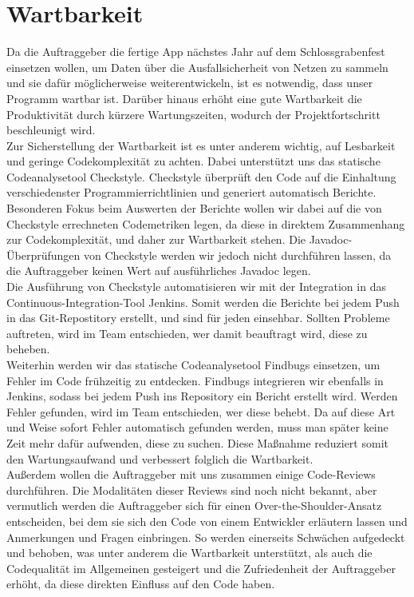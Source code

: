 \documentclass[accentcolor=tud0b,12pt,paper=a4]{tudreport}
\begin{document}
    \section{Wartbarkeit}

    Da die Auftraggeber die fertige App nächstes Jahr auf dem Schlossgrabenfest einsetzen wollen, um Daten über die Ausfallsicherheit von Netzen zu sammeln und sie dafür möglicherweise weiterentwickeln, ist es notwendig, dass unser Programm wartbar ist. Darüber hinaus erhöht eine gute Wartbarkeit die Produktivität durch kürzere Wartungszeiten, wodurch der Projektfortschritt beschleunigt wird.\\

                Zur Sicherstellung der Wartbarkeit ist es unter anderem wichtig, auf Lesbarkeit und geringe Codekomplexität zu achten. Dabei unterstützt uns das statische Codeanalysetool Checkstyle. Checkstyle überprüft den Code auf die Einhaltung verschiedenster Programmierrichtlinien und generiert automatisch Berichte. Besonderen Fokus beim Auswerten der Berichte wollen wir dabei auf die von Checkstyle errechneten Codemetriken legen, da diese in direktem Zusammenhang zur Codekomplexität, und daher zur Wartbarkeit stehen. Die Javadoc-Überprüfungen von Checkstyle werden wir jedoch nicht durchführen lassen, da die Auftraggeber keinen Wert auf ausführliches Javadoc legen.\\

                Die Ausführung von Checkstyle automatisieren wir mit der Integration in das Continuous-Integration-Tool Jenkins. Somit werden die Berichte bei jedem Push in das Git-Repostitory erstellt, und sind für jeden einsehbar. Sollten Probleme auftreten, wird im Team entschieden, wer damit beauftragt wird, diese zu beheben.\\

                Weiterhin werden wir das statische Codeanalysetool Findbugs einsetzen, um Fehler im Code frühzeitig zu entdecken. Findbugs integrieren wir ebenfalls in Jenkins, sodass bei jedem Push ins Repository ein Bericht erstellt wird. Werden Fehler gefunden, wird im Team entschieden, wer diese behebt. Da auf diese Art und Weise sofort Fehler automatisch gefunden werden, muss man später keine Zeit mehr dafür aufwenden, diese zu suchen. Diese Maßnahme reduziert somit den Wartungsaufwand und verbessert folglich die Wartbarkeit.\\

                Außerdem wollen die Auftraggeber mit uns zusammen einige Code-Reviews durchführen. Die Modalitäten dieser Reviews sind noch nicht bekannt, aber vermutlich werden die Auftraggeber sich für einen Over-the-Shoulder-Ansatz entscheiden, bei dem sie sich den Code von einem Entwickler erläutern lassen und Anmerkungen und Fragen einbringen. So werden einerseits Schwächen aufgedeckt und behoben, was unter anderem die Wartbarkeit unterstützt, als auch die Codequalität im Allgemeinen gesteigert und die Zufriedenheit der Auftraggeber erhöht, da diese direkten Einfluss auf den Code haben.
\end{document}
